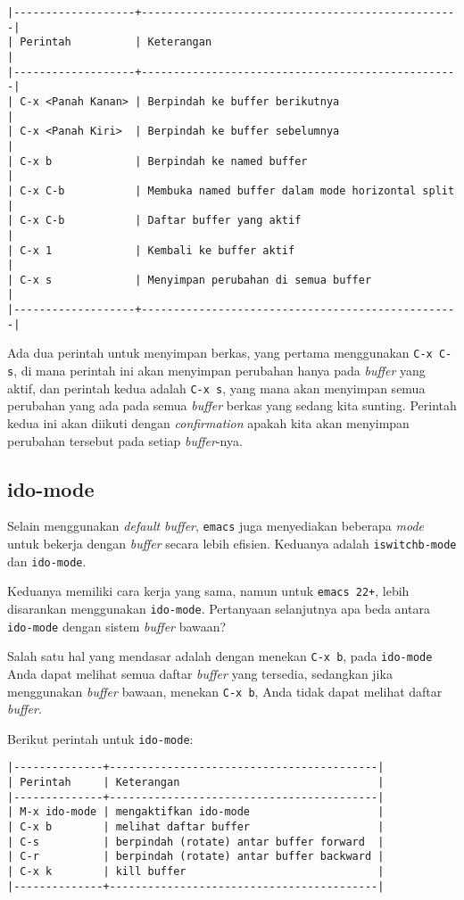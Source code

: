 \documentclass{article}
\begin{document}
\begin{verbatim}
|-------------------+--------------------------------------------------|
| Perintah          | Keterangan                                       |
|-------------------+--------------------------------------------------|
| C-x <Panah Kanan> | Berpindah ke buffer berikutnya                   |
| C-x <Panah Kiri>  | Berpindah ke buffer sebelumnya                   |
| C-x b             | Berpindah ke named buffer                        |
| C-x C-b           | Membuka named buffer dalam mode horizontal split |
| C-x C-b           | Daftar buffer yang aktif                         |
| C-x 1             | Kembali ke buffer aktif                          |
| C-x s             | Menyimpan perubahan di semua buffer              |
|-------------------+--------------------------------------------------|
\end{verbatim}

Ada dua perintah untuk menyimpan berkas, yang pertama menggunakan
\verb=C-x C-s=, di mana perintah ini akan menyimpan perubahan hanya pada 
\emph{buffer} yang aktif, dan perintah kedua adalah \verb=C-x s=, yang mana 
akan menyimpan semua perubahan yang ada pada semua \emph{buffer} berkas
yang sedang kita sunting. Perintah kedua ini akan diikuti dengan
\emph{confirmation} apakah kita akan menyimpan perubahan tersebut pada setiap 
\emph{buffer}-nya.

\subsection{ido-mode}
Selain menggunakan \emph{default buffer}, \verb=emacs= juga menyediakan beberapa
\emph{mode} untuk bekerja dengan \emph{buffer} secara lebih efisien. Keduanya 
adalah \verb=iswitchb-mode= dan \verb=ido-mode=.

Keduanya memiliki cara kerja yang sama, namun untuk \verb=emacs 22+=, lebih 
disarankan menggunakan \verb=ido-mode=. Pertanyaan selanjutnya apa beda 
antara \verb=ido-mode= dengan sistem \emph{buffer} bawaan?

Salah satu hal yang mendasar adalah dengan menekan \verb=C-x b=, pada 
\verb=ido-mode= Anda dapat melihat semua daftar \emph{buffer} yang tersedia,
sedangkan jika menggunakan \emph{buffer} bawaan, menekan \verb=C-x b=, Anda 
tidak dapat melihat daftar \emph{buffer}.

Berikut perintah untuk \verb=ido-mode=:

\begin{verbatim}
|--------------+------------------------------------------|
| Perintah     | Keterangan                               |
|--------------+------------------------------------------|
| M-x ido-mode | mengaktifkan ido-mode                    |
| C-x b        | melihat daftar buffer                    |
| C-s          | berpindah (rotate) antar buffer forward  |
| C-r          | berpindah (rotate) antar buffer backward |
| C-x k        | kill buffer                              |
|--------------+------------------------------------------|
\end{verbatim}
\end{document}
